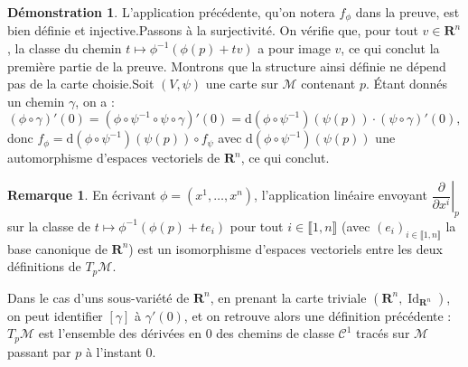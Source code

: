 \documentclass[12pt,a4paper]{article}
\DeclareMathOperator{\Id}{Id}
\theoremstyle{definition}
\newtheorem{rqe}[thm]{Remarque}
\newtheorem*{dem}{Démonstration}
\begin{document}
\begin{dem}
L'application précédente, qu'on notera $f_\phi$ dans la preuve, est bien définie et injective.\newline Passons à la surjectivité. On vérifie que, pour tout $v\in\mathbf{R}^n$, la classe du chemin $t\mapsto \phi^{-1}(\phi(p)+tv)$ a pour image $v$, ce qui conclut la première partie de la preuve. Montrons que la structure ainsi définie ne dépend pas de la carte choisie.\newline Soit $(V,\psi)$ une carte sur $\mathcal{M}$ contenant $p$. Étant donnés un chemin $\gamma$, on a :
$$
(\phi\circ\gamma)'(0)=(\phi\circ\psi^{-1}\circ\psi\circ\gamma)'(0)=\mathrm{d}(\phi\circ\psi^{-1})(\psi(p))\cdot (\psi\circ\gamma)'(0),
$$
donc $f_\phi=\mathrm{d}(\phi\circ\psi^{-1})(\psi(p))\circ f_\psi$ avec $\mathrm{d}(\phi\circ\psi^{-1})(\psi(p))$ une automorphisme d'espaces vectoriels de $\mathbf{R}^n$, ce qui conclut.
\end{dem}
\begin{rqe}
En écrivant $\phi=(x^1,\ldots,x^n)$, l'application linéaire envoyant $\left.\dfrac{\partial}{\partial x^i}\right|_p$ sur la classe de $t\mapsto\phi^{-1}(\phi(p)+te_i)$ pour tout $i\in\llbracket 1,n\rrbracket$ (avec $(e_i)_{i\in\llbracket 1,n\rrbracket}$ la base canonique de $\mathbf{R}^n$) est un isomorphisme d'espaces vectoriels entre les deux définitions de $T_p\mathcal{M}$.
\end{rqe}
Dans le cas d'uns sous-variété de $\mathbf{R}^n$, en prenant la carte triviale $(\mathbf{R}^n,\Id_{\mathbf{R}^n})$, on peut identifier $[\gamma]$ à $\gamma'(0)$, et on retrouve alors une définition précédente : $T_p\mathcal{M}$ est l'ensemble des dérivées en $0$ des chemins de classe $\mathcal{C}^1$ tracés sur $\mathcal{M}$ passant par $p$ à l'instant $0$.
\newpage
\end{document}
